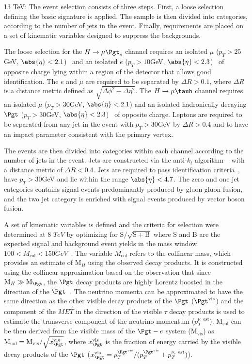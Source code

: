 13 TeV:
The event selection consists of three steps. First, a loose selection defining the basic
signature is applied. The sample is then divided into categories, according to the number of jets in the event.
Finally, requirements are placed on  a set of kinematic variables designed to suppress the backgrounds.

The loose selection for the  $H \rightarrow \mu \Pgt_{e}$  channel requires an isolated  $\mu$
($p_{T} > 25$GeV, 
$\abs{\eta} <2.1$)~\cite{Chatrchyan:2012xi} 
and an  isolated  $e$ ($p_{T} > 10$GeV, $\abs{\eta} <2.3$)~\cite{Khachatryan:2015hwa}  
of opposite charge lying within a region of the detector that allows good identification. The $e$ and $\mu$ are required to be separated by 
$\Delta R >0.1$, where $\Delta R$ is a distance metric defined as $\sqrt{\Delta\phi^{2} + \Delta\eta^{2}}$. The
$H \rightarrow \mu \tauh$ channel requires an isolated $\mu$ ($p_{T} > 30$GeV, $\abs{\eta} <2.1$) and an  isolated  hadronically decaying  $\Pgt$ ($p_{T} >30$GeV, $\abs{\eta} <2.3$)~\cite{Khachatryan:2015dfa} of opposite charge.
Leptons
are required to be separated from any jet in the event with $p_{T} >30$GeV by $\Delta R > 0.4$ and to have an impact parameter consistent with the primary vertex.

The events are then divided into categories within each channel according to the number of jets in the
event. Jets are constructed via the anti-$k_{t}$ algorithm ~\cite{Cacciari:2008gp} with a distance metric of $\Delta R < 0.4$. Jets are required to pass  identification criteria~\cite{CMS-PAS-JME-13-005}, have $p_{T}> 30$GeV and
lie within the range $\abs{\eta} < 4.7$. The zero and one jet categories contains signal events predominantly produced by gluon-gluon fusion, and the two jet category is enriched with signal events produced by vector boson fusion.

A set of kinematic variables is defined and the  criteria for  selection were determined at  8 $TeV$ by optimizing for $\mathrm{S}/\sqrt{\mathrm{S}+\mathrm{B}}$ where S and B are the expected signal and background event yields in the mass window $100  < M_\text{col} <  150GeV$~\cite{Khachatryan:2015kon}. The variable $M_\text{col}$ refers to the collinear mass, which provides an estimate of $\text{M}_{H}$ using the observed
decay products. It is constructed using the collinear approximation based on
the observation that since \mbox{$\text{M}_{H}\gg \text{M}_{\Pgt}$}, the $\Pgt$ decay products are
highly Lorentz boosted in the direction of the  $\Pgt$~\cite{Ellis:1987xu}.
The neutrino momenta
can be approximated to have the same
direction as the other visible decay products of the $\Pgt$ ($\Pgt^\text{vis}$)
and the component of the $\vec{MET}$ in the direction of the visible $\tau$ decay products is used to estimate the transverse component of the neutrino momentum ($p_{T}^{\nu,~\text{est}}$).
$\text{M}_{\text{col}}$ can be then derived from the visible mass of the $\Pgt-e$ system ($\text{M}_{\text{vis}}$) as $\text{M}_{\text{col}}= \text{M}_{\text{vis}} / \sqrt{x_{\Pgt}^\text{vis}}$, where $x_{\Pgt}^\text{vis}$ is the fraction of energy carried by the visible decay products of the $\Pgt$ ($x_{\Pgt}^\text{vis}={p_{T}^{\Pgt^{\text{vis}}}}/{(p_{T}^{\Pgt^\text{vis}}+p_{T}^{\nu,~\text{est}})}$).

